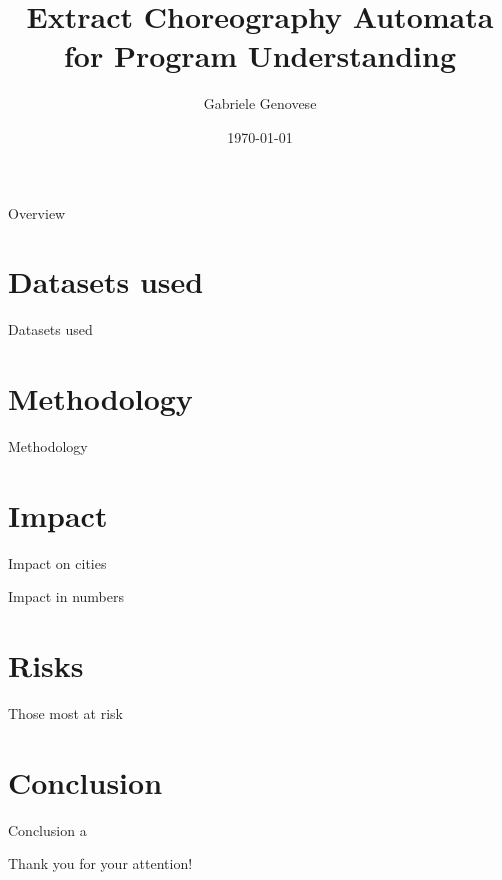 \documentclass{beamer}
\title{Extract Choreography Automata for Program Understanding}
\author{Gabriele Genovese}
\date{\today}
\begin{document}
\frame{\titlepage}

\begin{frame}{Overview}
\tableofcontents
\end{frame}

\section{Datasets used}
\begin{frame}{Datasets used}

\end{frame}

\section{Methodology}
\begin{frame}{Methodology}

\end{frame}

\section{Impact}
\begin{frame}{Impact on cities}

\end{frame}

\begin{frame}{Impact in numbers}

\end{frame}

\section{Risks}
\begin{frame}{Those most at risk}

\end{frame}


\section{Conclusion}
\begin{frame}{Conclusion}
a
\end{frame}


\begin{frame}{}
\centering
Thank you for your attention!
\end{frame}
\end{document}
